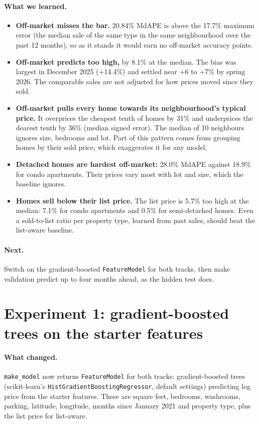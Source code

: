 \documentclass[11pt]{article}
\begin{document}
\paragraph{What we learned.}
\begin{itemize}
\item \textbf{Off-market misses the bar.} 20.84\% MdAPE is above the 17.7\% maximum error (the
  median sale of the same type in the same neighbourhood over the past 12 months), so as it stands
  it would earn no off-market accuracy points.
\item \textbf{Off-market predicts too high,} by 8.1\% at the median. The bias was largest in
  December 2025 (+14.4\%) and settled near +6 to +7\% by spring 2026. The comparable sales are
  not adjusted for how prices moved since they sold.
\item \textbf{Off-market pulls every home towards its neighbourhood's typical price.} It
  overprices the cheapest tenth of homes by 31\% and underprices the dearest tenth by 36\% (median
  signed error). The median of 10 neighbours ignores size, bedrooms and lot. Part of this pattern
  comes from grouping homes by their sold price, which exaggerates it for any model.
\item \textbf{Detached homes are hardest off-market:} 28.0\% MdAPE against 18.9\% for condo
  apartments. Their prices vary most with lot and size, which the baseline ignores.
\item \textbf{Homes sell below their list price.} The list price is 5.7\% too high at the
  median: 7.1\% for condo apartments and 0.5\% for semi-detached homes. Even a sold-to-list ratio
  per property type, learned from past sales, should beat the list-aware baseline.
\end{itemize}

\paragraph{Next.}
Switch on the gradient-boosted \texttt{FeatureModel} for both tracks, then make validation predict
up to four months ahead, as the hidden test does.

\section*{Experiment 1: gradient-boosted trees on the starter features}

\paragraph{What changed.}
\texttt{make\_model} now returns \texttt{FeatureModel} for both tracks: gradient-boosted trees
(scikit-learn's \texttt{HistGradientBoostingRegressor}, default settings) predicting log price from
the starter features. These are square feet, bedrooms, washrooms, parking, latitude, longitude,
months since January 2021 and property type, plus the list price for list-aware.
\end{document}
